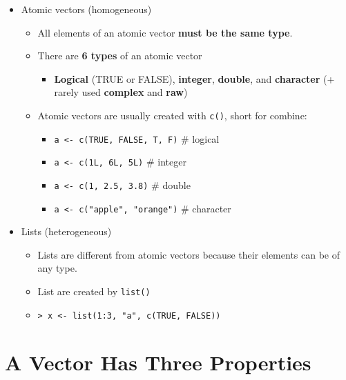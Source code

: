 \documentclass[]{book}
\providecommand{\tightlist}{%
  \setlength{\itemsep}{0pt}\setlength{\parskip}{0pt}}
\begin{document}
\begin{itemize}
\tightlist
\item
  Atomic vectors (homogeneous)

  \begin{itemize}
  \tightlist
  \item
    All elements of an atomic vector \textbf{must be the same type}.
  \item
    There are \textbf{6 types} of an atomic vector

    \begin{itemize}
    \tightlist
    \item
      \textbf{Logical} (TRUE or FALSE), \textbf{integer},
      \textbf{double}, and \textbf{character} (+ rarely used
      \textbf{complex} and \textbf{raw})
    \end{itemize}
  \item
    Atomic vectors are usually created with \texttt{c()}, short for
    combine:

    \begin{itemize}
    \tightlist
    \item
      \texttt{a\ \textless{}-\ c(TRUE,\ FALSE,\ T,\ F)} \# logical
    \item
      \texttt{a\ \textless{}-\ c(1L,\ 6L,\ 5L)} \# integer
    \item
      \texttt{a\ \textless{}-\ c(1,\ 2.5,\ 3.8)} \# double
    \item
      \texttt{a\ \textless{}-\ c("apple",\ "orange")} \# character
    \end{itemize}
  \end{itemize}
\item
  Lists (heterogeneous)

  \begin{itemize}
  \tightlist
  \item
    Lists are different from atomic vectors because their elements can
    be of any type.
  \item
    List are created by \texttt{list()}
  \item
    \texttt{\textgreater{}\ x\ \textless{}-\ list(1:3,\ "a",\ c(TRUE,\ FALSE))}
  \end{itemize}
\end{itemize}

\section{A Vector Has Three
Properties}\label{a-vector-has-three-properties}
\end{document}
